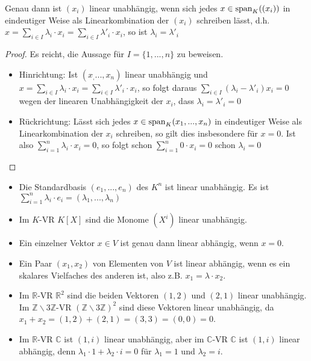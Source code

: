 \begin{proposition}
	Genau dann ist $(x_i)$ linear unabhängig, wenn sich jedes $x\in \operatorname{span}_K((x_i))$ in eindeutiger Weise 
	als Linearkombination der $(x_i)$ schreiben lässt, d.h. $x=\sum_{i\in I} \lambda_i\cdot x_i=\sum_{i
		\in I} \lambda'_i\cdot x_i$, so ist $\lambda_i=\lambda'_i$
\end{proposition}
\begin{proof}
	Es reicht, die Aussage für $I=\{1,...,n\}$ zu beweisen.
	\begin{itemize}
		\item Hinrichtung:  Ist $(x_,...,x_n)$ linear unabhängig und $x=\sum_{i\in I} \lambda_i\cdot x_i=\sum_{i\in I}
		\lambda'_i\cdot x_i$, so folgt daraus $\sum_{i\in I} (\lambda_i-\lambda'_i)x_i=0$ wegen der linearen 
		Unabhängigkeit der $x_i$, dass $\lambda_i=\lambda'_i=0$\\
		\item Rückrichtung: Lässt sich jedes $x\in \operatorname{span}_K(x_1,...,x_n)$ in eindeutiger Weise als Linearkombination der $x_i$ schreiben, 
		so gilt dies insbesondere für $x=0$. Ist also $\sum_{i=1}^n \lambda_i\cdot x_i=0$, so folgt schon $\sum_{
			i=1}^n 0\cdot x_i=0$ schon $\lambda_i=0$
	\end{itemize}
\end{proof}

\begin{example}
	\begin{itemize}
		\item Die Standardbasis $(e_1,...,e_n)$ des $K^n$ ist linear unabhängig. Es ist $\sum_{i=1}^n \lambda_i\cdot 
		e_i=(\lambda_1,...,\lambda_n)$
		\item Im $K$-VR $K[X]$ sind die Monome $(X^i)$ linear unabhängig.
		\item Ein einzelner Vektor $x\in V$ ist genau dann linear abhängig, wenn $x=0$.
		\item Ein Paar $(x_1,x_2)$ von Elementen von $V$ ist linear abhängig, wenn es ein skalares Vielfaches des anderen ist, also z.B. $x_1=
		\lambda\cdot x_2$.
		\item Im $\mathbb R$-VR $\mathbb R^2$ sind die beiden Vektoren $(1,2)$ und $(2,1)$ linear unabhängig. \\
		Im $\mathbb Z\backslash 3\mathbb Z$-VR $(\mathbb Z\backslash 3\mathbb Z)^2$ sind diese Vektoren linear unabhängig, da 
		$x_1+x_2=(1,2)+(2,1)=(3,3)=(0,0)=0$. 
		\item Im $\mathbb R$-VR $\mathbb C$ ist $(1,i)$ linear unabhängig, aber im $\mathbb C$-VR $\mathbb C$ ist $(1,i)$ 
		linear abhängig, denn $\lambda_1\cdot 1+\lambda_2\cdot i =0$ für $\lambda_1=1$ und $\lambda_2=i$.
	\end{itemize}
\end{example}

